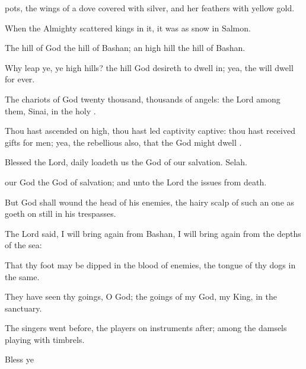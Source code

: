 {pots,
{} the
wings of a
dove
covered with
silver, and her
feathers with
yellow
gold.
\par }{\Q {}When the
Almighty
scattered
kings in it, it was
{} as
snow in
Salmon.
\par }{\BB \par }{\Q {}The
hill of
God
{} the
hill of
Bashan; an
high
hill
{} the
hill of
Bashan.
\par }{\Q {}Why
leap ye, ye
high
hills?
{} the
hill
{}
God
desireth to dwell
in; yea, the
{} will
dwell
{} for
ever.
\par }{\Q {}The
chariots of
God
{} twenty
thousand,
{}
thousands of
angels: the
Lord
{} among them,
{}
Sinai, in the
holy
{}.
\par }{\Q {}Thou hast
ascended on
high, thou hast led
captivity
captive: thou hast
received
gifts for
men; yea,
{} the
rebellious also, that the
{}
God might
dwell
{}.
\par }{\Q {}Blessed
{} the
Lord,
{}
daily
loadeth us
{} the
God of our
salvation.
Selah.
\par }{\Q {} our
God
{} the
God of
salvation; and unto
{} the
Lord
{} the
issues from
death.
\par }{\Q {}But
God shall
wound the
head of his
enemies,
{} the
hairy
scalp of such an one as goeth on
still in his
trespasses.
\par }{\BB \par }{\Q {}The
Lord
said, I will bring
again from
Bashan, I will bring
{}
again from the
depths of the
sea:
\par }{\Q {}That thy
foot may be
dipped in the
blood of
{}
enemies,
{} the
tongue of thy
dogs in the same.
\par }{\Q {}They have
seen thy
goings, O
God;
{} the
goings of my
God, my
King, in the
sanctuary.
\par }{\Q {}The
singers went
before, the players on
instruments
{}
after;
among
{} the
damsels playing with
timbrels.
\par }{\Q {}Bless ye
}
